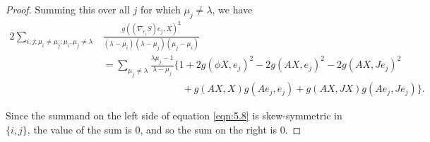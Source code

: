 \documentclass[10pt,a4paper]{amsart}
\begin{document}
\begin{proof}
Summing this over all $j$ for which $\mu_j\neq\lambda$, we have
%
\begin{equation}\label{eqn:5.8}
\begin{aligned}
2\sum_{i,j;\mu_i\neq\mu_j;\mu_i,\mu_j\neq\lambda}&\frac{g((\nabla_{e_i} S)e_j,X)^2}{(\lambda-\mu_i)(\lambda-\mu_j)(\mu_j-\mu_i)}\\
&=\sum_{\mu_j\neq\lambda}\frac{\lambda\mu_j-1}{\lambda-\mu_j}\Big\{1+2g(\phi X,e_j)^2-2g(AX,e_j)^2-2g(AX,Je_j)^2\\
&\qquad\qquad\qquad\qquad  +g(AX,X)g(Ae_j,e_j)+g(AX,JX)g(Ae_j,Je_j)\Big\}.
\end{aligned}
\end{equation}

Since the summand on the left side of equation \eqref{eqn:5.8} is skew-symmetric in $\{i,j\}$,
the value of the sum is $0$, and so the sum on the right is $0$.
\end{proof}
\end{document}
